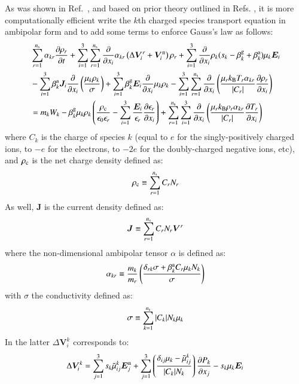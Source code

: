 \documentclass{warpdoc}
\newcommand{\ns}{{n_{\rm s}}}
\renewcommand{\vec}[1]{\bm{#1}}
\begin{document}
As was shown in Ref.\ \cite{jcp:2015:parent}, and based on prior theory outlined in Refs. \cite{jcp:2014:parent,jcp:2011:parent:2, jcp:2013:parent}, it is more computationally efficient write the $k$th charged species transport equation in ambipolar form and to add some terms to enforce Gauss's law as follows:
%
\begin{align}
  &  \sum_{r=1}^{\ns} \alpha_{kr} \frac{\partial \rho_r}{\partial t}  
+ \sum_{i=1}^3 \sum_{r=1}^\ns  \frac{\partial}{\partial x_i}      \alpha_{kr} \left( \Delta \vec{V}_i^r + \vec{V}^{\rm n}_i \right)\rho_r  
  + \sum_{i=1}^3 \frac{\partial}{\partial x_i}  \rho_k  (s_k-\beta_k^{\rm g}+ \beta^{\rm a}_k) \mu_k  \vec{E}_i   
\nonumber \\
&- \sum_{i=1}^3 \beta_k^{\rm a}\vec{J}_i \frac{\partial}{\partial x_i}  \left( \frac{\mu_k \rho_k}{\sigma} 
\right) 
+ \sum_{i=1}^3 \beta_k^{\rm g} \vec{E}_i \frac{\partial }{\partial x_i} \mu_{k} \rho_{k}
- \sum_{i=1}^3 \sum_{r=1}^{\ns} \frac{\partial}{\partial x_i} \left(\frac{\mu_r k_{\rm B} T_r \alpha_{kr}}{|C_r|}  \frac{\partial \rho_r}{\partial x_i}\right) 
\nonumber \\
&= m_k W_k
-\beta_k^{\rm g} \mu_{k} \rho_{k}\left(
  \frac{\rho_{\rm c}}{\epsilon_0\epsilon_r}
  -\sum_{i=1}^3 \frac{\vec{E}_i}{\epsilon_r} \frac{\partial \epsilon_r}{\partial x_i}  
\right)
+ \sum_{r=1}^\ns \sum_{i=1}^3  \frac{\partial}{\partial x_i} \left( \frac{\mu_r k_{\rm B} \rho_r  \alpha_{kr}}{|C_r|}   \frac{\partial T_r}{\partial x_i} \right)
\label{eqn:masscharged}
\end{align}
%
where $C_k$ is the charge of species $k$ (equal to $e$ for the singly-positively charged ions, to $-e$ for the electrons, to $-2e$ for the doubly-charged negative ions, etc), and $\rho_{\rm c}$ is the net charge density defined as:
%
\begin{equation}
 \rho_{\rm c} \equiv \sum_{r=1}^\ns  C_r N_r 
\label{eqn:rhoc}
\end{equation}
%
As well, $\vec{J}$ is the current density defined as:
%
\begin{equation}
 \vec{J} \equiv \sum_{r=1}^\ns  C_r N_r  \vec{V}^r
\label{eqn:J}
\end{equation}
%
where the non-dimensional ambipolar tensor $\alpha$ is defined as:
%
\begin{equation}
\alpha_{kr} \equiv \frac{m_k}{m_r}\left(\frac{\delta_{rk}\sigma + \beta^{\rm a}_k C_r  \mu_k N_k}{\sigma}\right)
\end{equation}
%
with $\sigma$ the conductivity defined as:
%
\begin{equation}
 \sigma \equiv \sum_{k=1}^\ns |C_k| N_k \mu_k
\label{eqn:sigma} 
\end{equation}
%
In the latter $\Delta \vec{V}_i^k$ corresponds to:
%
\begin{equation}
 \Delta \vec{V}_i^k = 
   \sum_{j=1}^3 s_k \wtilde{\mu}^k_{ij}  \vec{E}_j^{\rm n}
      + \sum_{j=1}^3  \left(\frac{\delta_{ij} \mu_k-\wtilde{\mu}^{k}_{ij}}{|C_k| N_k}\right) \frac{\partial P_k}{\partial x_j}
-  s_k \mu_k  \vec{E}_i
\end{equation}
%
\end{document}
